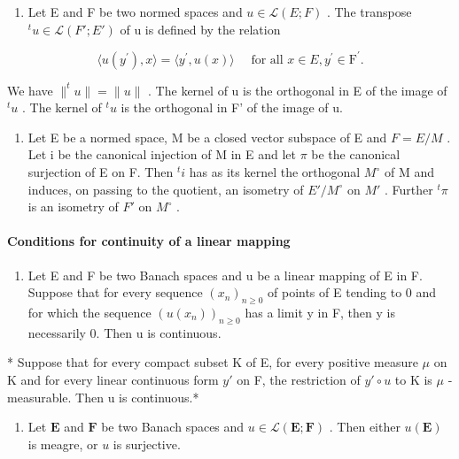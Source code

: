 \begin{enumerate}
\def\labelenumi{\arabic{enumi})}
\setcounter{enumi}{8}
\tightlist
\item
  Let E and F be two normed spaces and \(u \in \mathcal{L}(E; F)\) . The transpose \(^{t}u \in \mathcal{L}(F'; E')\) of u is defined by the relation
\end{enumerate}

\[
\langle u (y ^ {\prime}), x \rangle = \langle y ^ {\prime}, u (x) \rangle \quad \text {   for   all   } x \in E, y ^ {\prime} \in \mathrm{F} ^ {\prime}.\tag{6}
\]

We have \(\|^{t}u\| = \|u\|\) . The kernel of u is the orthogonal in E of the image of \(^{t}u\) . The kernel of \(^{t}u\) is the orthogonal in F' of the image of u.

\begin{enumerate}
\def\labelenumi{\arabic{enumi})}
\setcounter{enumi}{9}
\tightlist
\item
  Let E be a normed space, M be a closed vector subspace of E and \(F = E/M\) . Let i be the canonical injection of M in E and let \(\pi\) be the canonical surjection of E on F. Then \(^{t}i\) has as its kernel the orthogonal \(M^{\circ}\) of M and induces, on passing to the quotient, an isometry of \(E'/M^{\circ}\) on \(M'\) . Further \(^{t}\pi\) is an isometry of \(F'\) on \(M^{\circ}\) .
\end{enumerate}

\paragraph{Conditions for continuity of a linear mapping}

\begin{enumerate}
\def\labelenumi{\arabic{enumi})}
\setcounter{enumi}{10}
\tightlist
\item
  Let E and F be two Banach spaces and u be a linear mapping of E in F. Suppose that for every sequence \((x_{n})_{n\geqslant0}\) of points of E tending to 0 and for which the sequence \((u(x_{n}))_{n\geqslant0}\) has a limit y in F, then y is necessarily 0. Then u is continuous.
\end{enumerate}

* Suppose that for every compact subset K of E, for every positive measure \(\mu\) on K and for every linear continuous form \(y'\) on F, the restriction of \(y' \circ u\) to K is \(\mu\) -measurable. Then u is continuous.*

\begin{enumerate}
\def\labelenumi{\arabic{enumi})}
\setcounter{enumi}{11}
\tightlist
\item
  Let \(\mathbf{E}\) and \(\mathbf{F}\) be two Banach spaces and \(u \in \mathcal{L}(\mathbf{E};\mathbf{F})\) . Then either \(u(\mathbf{E})\) is meagre, or \(u\) is surjective.
\end{enumerate}

